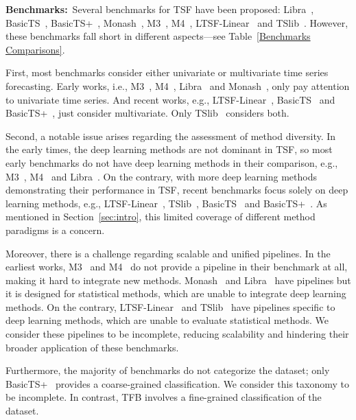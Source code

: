 \documentclass[sigconf, nonacm, pdfa]{acmart}
\begin{document}
\noindent
\textbf{Benchmarks:}~Several benchmarks for TSF have been proposed: Libra~\cite{bauer2021libra}, BasicTS~\cite{liang2022basicts}, BasicTS+~\cite{shao2023exploring}, Monash~\cite{godahewa2021monash}, M3~\cite{makridakis2000m3}, M4~\cite{makridakis2018m4}, LTSF-Linear~\cite{zeng2023transformers} and TSlib~\cite{wu2022timesnet}. However, these benchmarks fall short in different aspects---see Table~\ref{Benchmarks Comparisons}.

First, most benchmarks consider either univariate or multivariate time series forecasting. Early works, i.e., M3~\cite{makridakis2000m3}, M4~\cite{makridakis2018m4}, Libra~\cite{bauer2021libra} and Monash~\cite{godahewa2021monash}, only pay attention to univariate time series. And recent works, e.g., LTSF-Linear~\cite{zeng2023transformers}, BasicTS~\cite{liang2022basicts} and BasicTS+~\cite{shao2023exploring}, just consider multivariate. Only TSlib~\cite{wu2022timesnet} considers both. 

Second, a notable issue arises regarding the assessment of method diversity. In the early times, the deep learning methods are not dominant in TSF, so most early benchmarks do not have deep learning methods in their comparison, e.g., M3~\cite{makridakis2000m3}, M4~\cite{makridakis2018m4} and Libra~\cite{bauer2021libra}. On the contrary, with more deep learning methods demonstrating their performance in TSF, recent benchmarks focus solely on deep learning methods, e.g., LTSF-Linear~\cite{zeng2023transformers}, TSlib~\cite{wu2022timesnet}, BasicTS~\cite{liang2022basicts} and BasicTS+~\cite{shao2023exploring}. As mentioned in Section~\ref{sec:intro}, this limited coverage of different method paradigms is a concern. 


Moreover, there is a challenge regarding scalable and unified pipelines. In the earliest works, M3~\cite{makridakis2000m3} and M4~\cite{makridakis2018m4} do not provide a pipeline in their benchmark at all, making it hard to integrate new methods. Monash~\cite{godahewa2021monash} and Libra~\cite{bauer2021libra} have pipelines but it is designed for statistical methods, which are unable to integrate deep learning methods. On the contrary, LTSF-Linear~\cite{zeng2023transformers} and TSlib~\cite{wu2022timesnet} have pipelines specific to deep learning methods, which are unable to evaluate statistical methods. We consider these pipelines to be incomplete, reducing scalability and hindering their broader application of these benchmarks.

Furthermore, the majority of benchmarks do not categorize the dataset; only BasicTS+~\cite{shao2023exploring} provides a coarse-grained classification. We consider this taxonomy to be incomplete. In contrast, TFB involves a fine-grained classification of the dataset.
\end{document}
